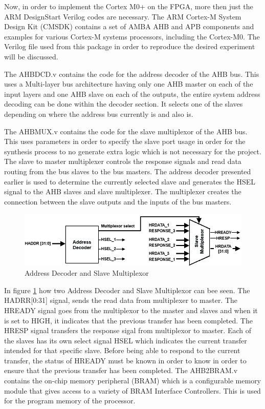 Now, in order to implement the Cortex M0+ on the FPGA, more then just the ARM DesignStart Verilog codes are necessary. The ARM Cortex-M System Design Kit (CMSDK) contains a set of AMBA AHB and APB components and examples for various Cortex-M systems processors, including the Cortex-M0. The  Verilog file  used from this package in order to reproduce the desired experiment will be discussed.

The AHBDCD.v contains the code for the address decoder of the AHB bus. This uses a Multi-layer bus architecture having only one AHB master on each of the input layers and one AHB slave on each of the outputs, the entire system address decoding can be done within the decoder section. It selects one of the slaves depending on where the address bus currently is and also is.

The AHBMUX.v contains the code for the slave multiplexor of the AHB bus. This uses parameters in order to specify the slave port usage in order for the synthesis process to no generate extra logic which is not necessary for the project. The slave to master multiplexer controls the response signals and read data routing from the bus slaves to the bus masters. The address decoder presented earlier is used to determine the currently selected slave and generates the HSEL signal to the AHB slaves and slave multiplexer. The multiplexer creates the connection between the slave outputs and the inputs of the bus masters. 

\begin{figure}
\centering
\includegraphics[scale=0.7]{figures/decoder_and_multiplexer.PNG}
\caption{Address Decoder and Slave Multiplexor } 
\label{fig:decoder_multiplexer}
\end{figure}
In figure \ref{fig:decoder_multiplexer} how two Address Decoder and Slave Multiplexor can bee seen. The HADRR[0:31] signal, sends the read data from multiplexer to master. The HREADY signal goes from the multiplexor to the master and slaves and when it is set to HIGH, it indicates that the previous transfer has been completed. The HRESP signal transfers the response sigal from multiplexor to master. Each of the slaves has its own select signal HSEL which indicates the current transfer intended for that specific slave. Before being able to respond to the current transfer, the status of HREADY must be known in order to know in order to ensure that the previous transfer has been completed. 
The AHB2BRAM.v contains the on-chip memory peripheral (BRAM) 
which is a configurable memory module that gives access to a variety of BRAM Interface Controllers. This is used for the program memory of the processor.

